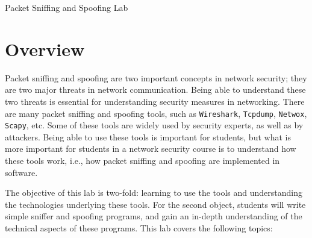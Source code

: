 
\newcommand{\commonfolder}{../../common-files}




\newcommand{\pcap} {\texttt{pcap}\xspace}
\newcommand{\telnet} {\texttt{telnet}\xspace}







\begin{center}
{\LARGE Packet Sniffing and Spoofing Lab}
\end{center}



\setcounter{task}{1}
\newcommand{\tasks} {\bf {\noindent (\arabic{task})} \addtocounter{task}{1} \,}

\section{Overview}

Packet sniffing and spoofing are two important concepts in
network security; they are two major threats in network 
communication. Being able to understand these two threats 
is essential for understanding security measures in 
networking. There are many packet sniffing and spoofing tools,
such as {\tt Wireshark}, {\tt Tcpdump}, {\tt Netwox}, \texttt{Scapy}, etc.
Some of these tools are widely used by security experts, as well as by
attackers. Being able to use these tools is important
for students, but what is more important for students in 
a network security course is to understand how these tools work,
i.e., how packet sniffing and spoofing are implemented  
in software.

The objective of this lab is two-fold: learning to use the tools 
and understanding the technologies underlying these tools. 
For the second object, students will write simple sniffer and spoofing programs,
and gain an in-depth understanding of the technical aspects of these programs.
This lab covers the following topics:


